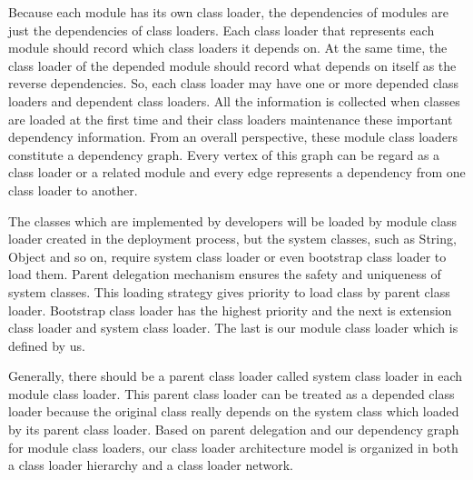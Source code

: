 \documentclass[conference]{IEEEtran}
\begin{document}
Because each module has its own class loader, the dependencies of modules are just the dependencies of class loaders.
Each class loader that represents each module should record which class loaders it depends on.
At the same time, the class loader of the depended module should record what depends on itself as the reverse dependencies.
So, each class loader may have one or more depended class loaders and dependent class loaders.
All the information is collected when classes are loaded at the first time and their class loaders maintenance these important dependency information. 
From an overall perspective, these module class loaders constitute a dependency graph.
Every vertex of this graph can be regard as a class loader or a related module and every edge represents a dependency from one class loader to another.

The classes which are implemented by developers will be loaded by module class loader created in the deployment process, but the system classes, such as String, Object and so on, require system class loader or even bootstrap class loader to load them.
Parent delegation mechanism\cite{parent_delegation} ensures the safety and uniqueness of system classes.
This loading strategy gives priority to load class by parent class loader.
Bootstrap class loader has the highest priority and the next is extension class loader and system class loader.
The last is our module class loader which is defined by us.

Generally, there should be a parent class loader called system class loader in each module class loader.
This parent class loader can be treated as a depended class loader because the original class really depends on the system class which loaded by its parent class loader.
Based on parent delegation and our dependency graph for module class loaders, our class loader architecture model is organized in both a class loader hierarchy and a class loader network\cite{class_loader_patent}.

\end{document}
